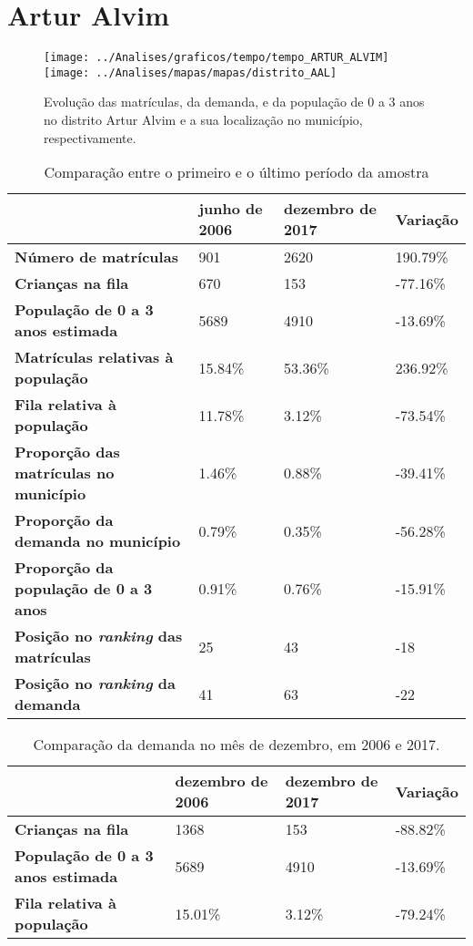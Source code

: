 \section{Artur Alvim}
\begin{figure}[H]
\centering
\texttt{[image: ../Analises/graficos/tempo/tempo\_ARTUR\_ALVIM]}
\texttt{[image: ../Analises/mapas/mapas/distrito\_AAL]}
\caption{Evolução das matrículas, da demanda, e da população de 0 a 3 anos no distrito Artur Alvim e a sua localização no município, respectivamente.}
\end{figure}
\begin{table}[H]
\begin{tabular}{l|l|l|l}
\textbf{}                                      & \textbf{junho de 2006}       & \textbf{dezembro de 2017}    & \textbf{Variação} \\ \hline
\textbf{Número de matrículas}                  & 901 & 2620 & 190.79\% \\ \hline
\textbf{Crianças na fila}                      & 670 & 153 & -77.16\% \\ \hline
\textbf{População de 0 a 3 anos estimada}      & 5689 & 4910 & -13.69\% \\ \hline
\textbf{Matrículas relativas à população}      & 15.84\% & 53.36\% & 236.92\% \\ \hline
\textbf{Fila relativa à população}             & 11.78\% & 3.12\% & -73.54\% \\ \hline
\textbf{Proporção das matrículas no município} & 1.46\% & 0.88\% & -39.41\% \\ \hline
\textbf{Proporção da demanda no município}     & 0.79\% & 0.35\% & -56.28\% \\ \hline
\textbf{Proporção da população de 0 a 3 anos}  & 0.91\% & 0.76\% & -15.91\% \\ \hline
\textbf{Posição no \textit{ranking} das matrículas}     & 25 & 43 & -18 \\ \hline
\textbf{Posição no \textit{ranking} da demanda}         & 41 & 63 & -22 \\ 
\end{tabular}
\caption{Comparação entre o primeiro e o último período da amostra}
\end{table}
\begin{table}[H]
\begin{tabular}{l|l|l|l}
\textbf{}                                 & \textbf{dezembro de 2006} & \textbf{dezembro de 2017} & \textbf{Variação} \\ \hline
\textbf{Crianças na fila}                      & 1368 & 153 & -88.82\% \\ \hline
\textbf{População de 0 a 3 anos estimada}      & 5689 & 4910 & -13.69\% \\ \hline
\textbf{Fila relativa à população}             & 15.01\% & 3.12\% & -79.24\% \\
\end{tabular}
\caption{Comparação da demanda no mês de dezembro, em 2006 e 2017.}
\end{table}

